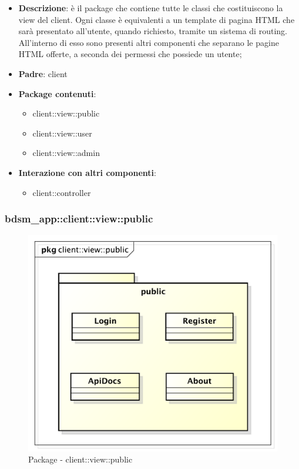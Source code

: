 \begin{itemize}
	\item \textbf{Descrizione}: è il package che contiene tutte le classi che costituiscono la view del client. Ogni classe è equivalenti a un template di pagina HTML che sarà presentato all'utente, quando richiesto, tramite un sistema di routing. \newline
	All'interno di esso sono presenti altri componenti che separano le pagine HTML offerte, a seconda dei permessi che possiede un utente;
	\item \textbf{Padre}: client
	\item \textbf{Package contenuti}:
		\begin{itemize}
			\item client::view::public
			\item client::view::user
			\item client::view::admin
		\end{itemize}
	\item \textbf{Interazione con altri componenti}:
		\begin{itemize}
			\item client::controller
		\end{itemize}
\end{itemize}

\pagebreak

\subsubsection{bdsm\_app::client::view::public} %
\label{ssub:bdsm_app_client_view_public}
\begin{figure}[htbp]
	\centering
	\centerline{\includegraphics[scale=0.6]{./images/client_view_public.pdf}}
	\caption{Package - client::view::public}
\end{figure}

